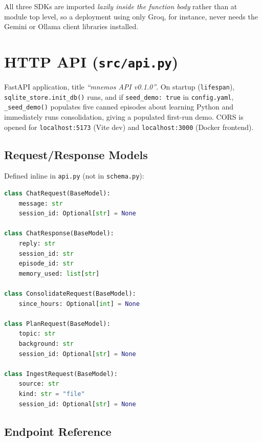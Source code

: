 \documentclass[11pt,a4paper]{report}
\newcommand{\code}[1]{\texttt{\small #1}}
\newcommand{\file}[1]{\texttt{\small\color{accent!70!black}#1}}
\begin{document}
All three SDKs are imported \emph{lazily inside the function body} rather than at module top level, so a deployment using only Groq, for instance, never needs the Gemini or Ollama client libraries installed.

\chapter{HTTP API (\file{src/api.py})}

FastAPI application, title \emph{``mnemos API v0.1.0''}. On startup (\code{lifespan}), \code{sqlite\_store.init\_db()} runs, and if \code{seed\_demo: true} in \file{config.yaml}, \code{\_seed\_demo()} populates five canned episodes about learning Python and immediately runs consolidation, giving a populated first-run demo. CORS is opened for \code{localhost:5173} (Vite dev) and \code{localhost:3000} (Docker frontend).

\section{Request/Response Models}

Defined inline in \file{api.py} (not in \file{schema.py}):

\begin{lstlisting}[language=Python]
class ChatRequest(BaseModel):
    message: str
    session_id: Optional[str] = None

class ChatResponse(BaseModel):
    reply: str
    session_id: str
    episode_id: str
    memory_used: list[str]

class ConsolidateRequest(BaseModel):
    since_hours: Optional[int] = None

class PlanRequest(BaseModel):
    topic: str
    background: str
    session_id: Optional[str] = None

class IngestRequest(BaseModel):
    source: str
    kind: str = "file"
    session_id: Optional[str] = None
\end{lstlisting}

\section{Endpoint Reference}
\end{document}
